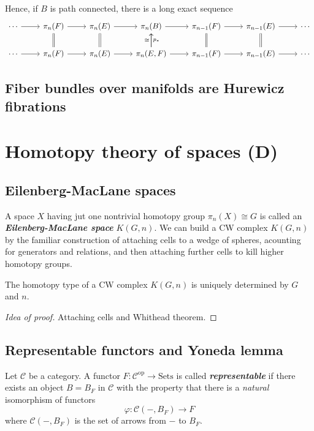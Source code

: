 \begin{remark}
\begin{definition}
\begin{thm}[Hatcher 4.41]
	Hence, if $B$ is path connected, there is a long exact sequence
$$\begin{tikzcd}
	\cdots\arrow[r]&\pi_n(F)\arrow[r]&\pi_n(E)\arrow[r]&\pi_n(B)\arrow[r]&\pi_{n-1}(F)\arrow[r]&\pi_{n-1}(E)\arrow[r]&\cdots\\
	\cdots\arrow[r]&\pi_n(F)\arrow[r]\arrow[u,equals]&\pi_n(E)\arrow[r]\arrow[u,equals]&\pi_n(E,F)\arrow[r]\arrow[u,"\cong "]\arrow[u,swap,"p_{*}"]&\pi_{n-1}(F)\arrow[r]\arrow[u,equals]&\pi_{n-1}(E)\arrow[r]\arrow[u,equals]&\cdots
\end{tikzcd}$$
\end{thm}

\subsection{Fiber bundles over manifolds are Hurewicz fibrations}

\section{Homotopy theory of spaces (D)}

\subsection{Eilenberg-MacLane spaces}
A space $X$ having jut one nontrivial homotopy group $\pi_{n}(X)\cong G$ is called an \textit{\textbf{Eilenberg-MacLane space}} $K(G,n)$. We can build a CW complex $K(G,n)$ by the familiar construction of attaching cells to a wedge of spheres, acounting for generators and relations, and then attaching further cells to kill higher homotopy groups.

\begin{prop}[4.30]
	The homotopy type of a CW complex $K(G,n)$ is uniquely determined by $G$ and $n$.
\end{prop}
\begin{proof}[Idea of proof]
	Attaching cells and Whithead theorem.
\end{proof}

\subsection{Representable functors and Yoneda lemma}

\begin{definition}
	Let $\mathcal{C}$ be a category. A functor $F:\mathcal{C}^{\text{op}}\to \text{Sets}$ is called \textit{\textbf{representable}} if there exists an object $B=B_{F}$ in $\mathcal{C}$ with the property that there is a \textit{natural} isomorphism of functors
	$$\varphi:\mathcal{C}(-,B_{F})\to F$$
	where $\mathcal{C}(-,B_{F})$ is the set of arrows from $-$ to $B_{F}$.


\end{definition}
\end{definition}
\end{remark}

